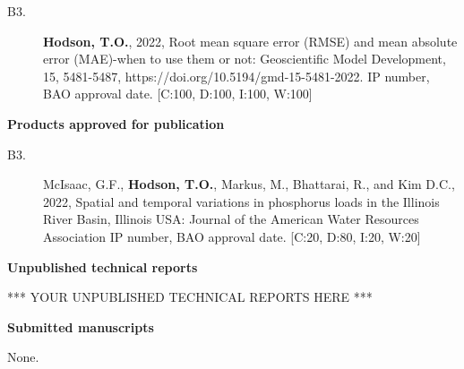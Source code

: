 \documentclass[12pt]{article}
\makeatletter
\def\namedlabel#1#2{\begingroup
	\def\@currentlabel{#2}%
	\label{#1}\endgroup
}
\makeatother
\begin{document}
\begin{description}
 	\item[B3.\namedlabel{rmse}{B3}] \textbf{Hodson, T.O.}, 2022, Root mean square error (RMSE)
    and mean absolute error (MAE)-when to use them or not: Geoscientific Model Development, 15, 5481-5487,
    https://doi.org/10.5194/gmd-15-5481-2022.
    IP number, BAO approval date. [C:100, D:100, I:100, W:100]

   
\end{description}


\vspace{10pt}
\raggedright \textbf{Products approved for publication} \\
\vspace{10pt}

\begin{description}
 	\item[B3.\namedlabel{nrec}{B3}] McIsaac, G.F., \textbf{Hodson, T.O.}, Markus, M., Bhattarai, R., and Kim D.C.,
    2022, Spatial and temporal variations in phosphorus loads in the Illinois River Basin, Illinois USA:
    Journal of the American Water Resources Association
    IP number, BAO approval date. [C:20, D:80, I:20, W:20]
\end{description}
 


\vspace{10pt}
\raggedright \textbf{Unpublished technical reports} \\
\vspace{10pt}



*** YOUR UNPUBLISHED TECHNICAL REPORTS HERE ***


\vspace{10pt}
\raggedright \textbf{Submitted manuscripts} \\
\vspace{10pt}

None.
\end{document}
